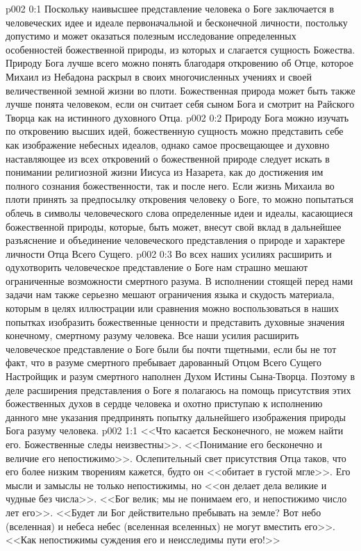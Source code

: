 \vs p002 0:1 Поскольку наивысшее представление человека о Боге заключается в человеческих идее и идеале первоначальной и бесконечной личности, постольку допустимо и может оказаться полезным исследование определенных особенностей божественной природы, из которых и слагается сущность Божества. Природу Бога лучше всего можно понять благодаря откровению об Отце, которое Михаил из Небадона раскрыл в своих многочисленных учениях и своей величественной земной жизни во плоти. Божественная природа может быть также лучше понята человеком, если он считает себя сыном Бога и смотрит на Райского Творца как на истинного духовного Отца.
\vs p002 0:2 Природу Бога можно изучать по откровению высших идей, божественную сущность можно представить себе как изображение небесных идеалов, однако самое просвещающее и духовно наставляющее из всех откровений о божественной природе следует искать в понимании религиозной жизни Иисуса из Назарета, как до достижения им полного сознания божественности, так и после него. Если жизнь Михаила во плоти принять за предпосылку откровения человеку о Боге, то можно попытаться облечь в символы человеческого слова определенные идеи и идеалы, касающиеся божественной природы, которые, быть может, внесут свой вклад в дальнейшее разъяснение и объединение человеческого представления о природе и характере личности Отца Всего Сущего.
\vs p002 0:3 Во всех наших усилиях расширить и одухотворить человеческое представление о Боге нам страшно мешают ограниченные возможности смертного разума. В исполнении стоящей перед нами задачи нам также серьезно мешают ограничения языка и скудость материала, которым в целях иллюстрации или сравнения можно воспользоваться в наших попытках изобразить божественные ценности и представить духовные значения конечному, смертному разуму человека. Все наши усилия расширить человеческое представление о Боге были бы почти тщетными, если бы не тот факт, что в разуме смертного пребывает дарованный Отцом Всего Сущего Настройщик и разум смертного наполнен Духом Истины Сына\hyp{}Творца. Поэтому в деле расширения представления о Боге я полагаюсь на помощь присутствия этих божественных духов в сердце человека и охотно приступаю к исполнению данного мне указания предпринять попытку дальнейшего изображения природы Бога разуму человека.
\vs p002 1:1 <<Что касается Бесконечного, не можем найти его. Божественные следы неизвестны>>. <<Понимание его бесконечно и величие его непостижимо>>. Ослепительный свет присутствия Отца таков, что его более низким творениям кажется, будто он <<обитает в густой мгле>>. Его мысли и замыслы не только непостижимы, но <<он делает дела великие и чудные без числа>>. <<Бог велик; мы не понимаем его, и непостижимо число лет его>>. <<Будет ли Бог действительно пребывать на земле? Вот небо (вселенная) и небеса небес (вселенная вселенных) не могут вместить его>>. <<Как непостижимы суждения его и неисследимы пути его!>>

